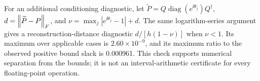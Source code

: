 For an additional conditioning diagnostic, let $\widetilde P=Q\operatorname{diag}(e^{\ii\theta_j})Q^\dagger$, $d=\left\lVert \widetilde P-P\right\rVert_F$, and $\nu=\max_j|e^{\ii\theta_j}-1|+d$. The same logarithm-series argument gives a reconstruction-distance diagnostic $d/[h(1-\nu)]$ when $\nu<1$. Its maximum over applicable cases is $2.60\times10^{-9}$, and its maximum ratio to the observed positive bound slack is 0.000961. This check supports numerical separation from the bounds; it is not an interval-arithmetic certificate for every floating-point operation.
